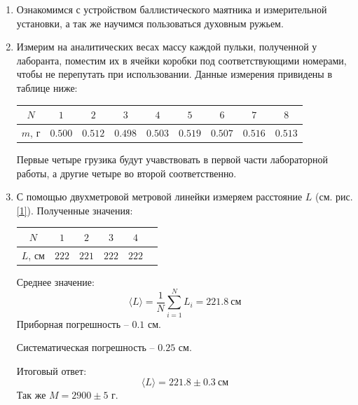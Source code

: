 \documentclass[a4paper,12pt]{article}
\begin{document}
\begin{enumerate}
    \item Ознакомимся с устройством баллистического маятника и измерительной установки, а так же научимся пользоваться духовным ружьем.
    \item Измерим на аналитических весах массу каждой пульки, полученной у лаборанта, поместим их в ячейки коробки под соответствующими номерами, чтобы не перепутать при использовании. Данные измерения привидены в таблице ниже:
    \begin{table}[h]
        \centering
        \begin{tabular}{|c|c|c|c|c|c|c|c|c|} \hline 
            $N$ & $1$ & $2$ & $3$ & $4$ & $5$ & $6$ & $7$ & $8$ \\ \hline
            $m$, г & $0.500$ & $0.512$ & $0.498$ & $0.503$ & $0.519$ & $0.507$ & $0.516$ & $0.513$ \\ \hline 
        \end{tabular} 
    \end{table}

    Первые четыре грузика будут учавствовать в первой части лабораторной работы, а другие четыре во второй соответственно.
    \item С помощью двухметровой метровой линейки измеряем расстояние $L$ (см. рис. \ref{1}). Полученные значения:
    \begin{table}[h]
        \centering
        \begin{tabular}{|c|c|c|c|c|c|} \hline 
            $N$ & $1$ & $2$ & $3$ & $4$ \\ \hline
            $L$, см  & $222$ & $221$ & $222$ & $222$ \\ \hline 
        \end{tabular}
    \end{table}
    
    Среднее значение: 
    $$
    \langle L\rangle = \frac{1}{N}\sum_{i = 1}^{N} L_i = 221.8~\text{см}
    $$
    Приборная погрешность -- $0.1$ см.

    Систематическая погрешность -- $0.25$ см.

    Итоговый ответ:
    $$
    \langle L\rangle = 221.8 \pm 0.3~\text{см}
    $$
    Так же $M = 2900 \pm 5$ г.


\end{enumerate}
\end{document}
